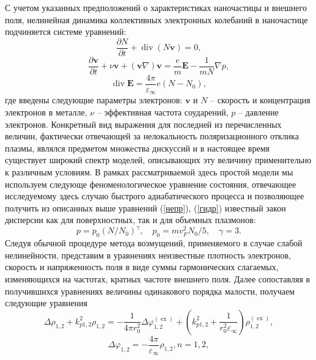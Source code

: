 \documentclass[12pt, a4paper]{article}
\renewcommand{\vec}{\mathbf}
\def \eps {\varepsilon}
\def \ph {\varphi}
\def \ex { \operatorname{ex}}
\newcommand{\dt}[1]{\frac{\partial {#1}}{\partial t}}
\begin{document}
С учетом указанных предположений о характеристиках наночастицы и внешнего поля, нелинейная динамика коллективных электронных колебаний в наночастице подчиняется системе уравнений:
\begin{equation} 
	\label{непр}
	\dt{N} + \operatorname{div}(N \vec{v}) = 0,
\end{equation}
\begin{equation} 
	\label{гидр}
	\dt{\vec{v}} + \nu \vec{v} +(\vec{v} \nabla)\vec{v} = \frac{e}{m}\vec{E} - \frac{1}{mN} \nabla p, 
\end{equation}
\begin{equation} 
	\label{максв}
	\operatorname{div}\vec{E} = \frac{4\pi}{\eps_\infty}e(N-N_0),
\end{equation}
где введены следующие параметры электронов: $\vec{v}$ и $N$ – скорость и концентрация электронов в металле, $\nu$ – эффективная частота соударений, 
$p$ – давление электронов. Конкретный вид выражения для последней из перечисленных величин, фактически отвечающей за нелокальность поляризационного отклика плазмы, являлся предметом множества дискуссий и в настоящее время существует широкий спектр моделей, описывающих эту величину применительно к различным условиям. В рамках рассматриваемой здесь простой модели мы используем следующе феноменологическое уравнение состояния, отвечающее исследуемому здесь случаю быстрого адиабатического процесса и позволяющее получить из описанных выше уравнений (\ref{непр}), (\ref{гидр}) известный закон дисперсии как для поверхностных, так и для объемных плазмонов: 
\begin{equation}
	\label{p}
 p = p_0 (N/N_0)^\gamma, \quad p_0 = m v_F^2 N_0/5, \quad \gamma = 3.
\end{equation}
Следуя обычной процедуре метода возмущений, применяемого в случае слабой нелинейности, представим в уравнениях неизвестные плотность электронов, скорость и напряженность поля в виде суммы гармонических слагаемых, изменяющихся на частотах, кратных частоте внешнего поля. Далее сопоставляя в получившихся уравнениях величины одинакового порядка малости, получаем следующие уравнения
\begin{equation} 
	\label{rho_sys}
 \Delta \rho_{1,2} + k_{p1,2}^2\rho_{1,2} = -\frac{1}{4 \pi r_0^2} \Delta \ph^{(\ex)}_{1,2} + \left( k_{p1,2}^2 + \frac{1}{r_0^2\eps_\infty}\right) {\rho^{(\ex)}_{1,2},}
\end{equation}
\begin{equation} 
	\label{phi_sys}
 \Delta \ph_{1,2} = - \frac{4 \pi}{\eps_\infty} \rho_{1,2}, n = 1,2,
\end{equation}
\end{document}
